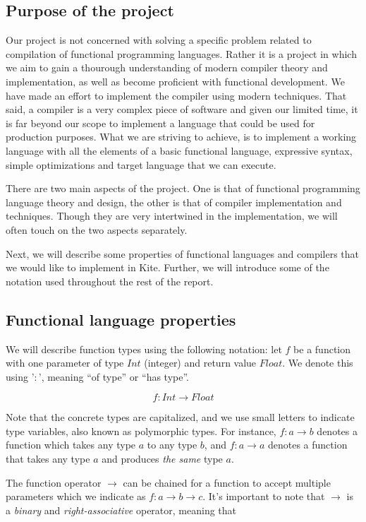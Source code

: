 
\subsection{Purpose of the project}
Our project is not concerned with solving a specific problem related to compilation of functional programming languages. Rather it is a project in which we aim to gain a thourough understanding of modern compiler theory and implementation, as well as become proficient with functional development. We have made an effort to implement the compiler using modern techniques. That said, a compiler is a very complex piece of software and given our limited time, it is far beyond our scope to implement a language that could be used for production purposes. What we are striving to achieve, is to implement a working language with all the elements of a basic functional language, expressive syntax, simple optimizations and target language that we can execute.

There are two main aspects of the project. One is that of functional programming language theory and design, the other is that of compiler implementation and techniques. Though they are very intertwined in the implementation, we will often touch on the two aspects separately.

Next, we will describe some properties of functional languages and compilers that we would like to implement in Kite. Further, we will introduce some of the notation used throughout the rest of the report.

\subsection{Functional language properties}
We will describe function types using the following notation: let $f$ be a function with one parameter of type $Int$ (integer) and return value $Float$. We denote this using '$:$', meaning ``of type'' or ``has type''.

\[ f: Int \to Float \]

Note that the concrete types are capitalized, and we use small letters to indicate type variables, also known as polymorphic types. For instance, $f: a \to b$ denotes a function which takes any type $a$ to any type $b$, and $f: a \to a$ denotes a function that takes any type $a$ and produces \emph{the same} type $a$.

The function operator $\to$ can be chained for a function to accept multiple parameters which we indicate as $f: a \to b \to c$. It's important to note that $\to$ is a \emph{binary} and \emph{right-associative} operator, meaning that

